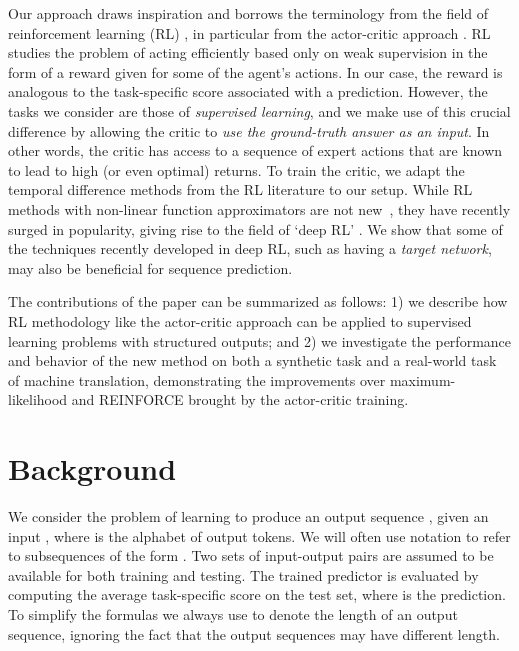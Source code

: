 \documentclass{article} \usepackage{iclr2017_conference,times}
\begin{document}
Our approach draws inspiration and borrows the terminology from the field of
reinforcement learning (RL) \citep{sutton1998introduction}, in particular from
the actor-critic approach \citep{sutton1984temporal,sutton1999policy,barto1983neuronlike}.  RL
studies the problem of acting efficiently based
only on weak supervision in the form of a reward given for some of the agent's actions.
In our case, the reward is analogous to the task-specific score associated with a prediction.
However, the tasks we consider are those of \textit{supervised learning}, and
we make use of this crucial difference by allowing the critic to \textit{use the
ground-truth answer as an input}.
In other words, the critic has access to a sequence of expert actions that are
known to lead to high (or even optimal) returns. 
To train the critic, we adapt the temporal
difference methods from the RL literature \citep{sutton1988learning} to our setup.
While RL methods with non-linear function approximators are not new~\citep{tesauro1994td,miller1995neural}, 
they have recently surged in popularity, giving rise to the field of `deep RL'
\citep{mnih2015human}. We show that some of the techniques recently developed in deep RL, such as having a \textit{target network}, may also be beneficial for sequence prediction.

The contributions of the paper can be summarized as follows: 1) we describe how
RL methodology like the actor-critic approach can be applied to
supervised learning problems with structured outputs; and 2) we investigate the
performance and behavior of the new method on both a synthetic task and a
real-world task of machine translation, demonstrating the improvements over
maximum-likelihood and REINFORCE brought by the actor-critic training.

\section{Background}
We consider the problem of learning to produce an output sequence ,  given an input , where  is
the alphabet of output tokens. We will often use notation  to
refer to subsequences of the form .
Two sets of input-output pairs  are
assumed to be available for both training and testing. The
trained predictor  is evaluated by computing the average task-specific score
 on the test set, where  is the prediction.
 To
simplify the formulas we always use  to denote the length of an output sequence, ignoring the fact that the output sequences may have different length.
\end{document}
